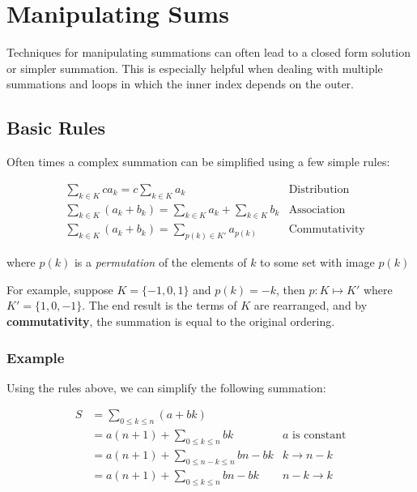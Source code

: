 \documentclass{standalone}
\begin{document}
\section{Manipulating Sums}

Techniques for manipulating summations can often lead to a closed form solution or simpler summation.
This is especially helpful when dealing with multiple summations and loops in which the inner index depends on the outer.

\subsection{Basic Rules}

Often times a complex summation can be simplified using a few simple rules:

\begin{align*}
  &\sum_{k \in K} c a_k = c \sum_{k \in K} a_k &\text{Distribution} \\
  &\sum_{k \in K} (a_k + b_k) = \sum_{k \in K} a_k + \sum_{k \in K} b_k &\text{Association} \\
  &\sum_{k \in K} (a_k + b_k) = \sum_{p(k) \in K'} a_{p(k)} &\text{Commutativity}
\end{align*}

where $p(k)$ is a \emph{permutation} of the elements of $k$ to some set with image $p(k)$

For example, suppose $K  = \{-1, 0, 1\}$ and $p(k) = -k$, then $p : K \mapsto K'$ where $K' = \{1, 0, -1\}$.
The end result is the terms of $K$ are rearranged, and by \textbf{commutativity}, the summation is equal to the original ordering.

\subsubsection{Example}

Using the rules above, we can simplify the following summation:

\begin{align*} \label{eq:sum_manip_example}
  S &= \sum_{0 \leqslant k \leqslant n} (a + bk) \\
  &= a(n+1) + \sum_{0 \leqslant k \leqslant n} bk &\text{$a$ is constant} \\
  &= a(n+1) + \sum_{0 \leqslant n-k \leqslant n} bn - bk &\text{$k \to n-k$} \\
  &= a(n+1) + \sum_{0 \leqslant k \leqslant n} bn - bk &\text{$n-k \to k$} \\
\end{align*}
\end{document}
